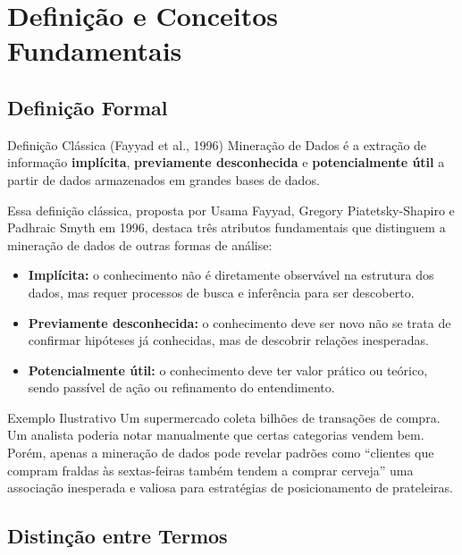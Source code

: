 \documentclass[12pt,a4paper]{article}
\begin{document}
\section{Definição e Conceitos Fundamentais}

\subsection{Definição Formal}

\begin{definicaobox}{Definição Clássica (Fayyad et al., 1996)}
Mineração de Dados é a extração de informação \textbf{implícita},
\textbf{previamente desconhecida} e \textbf{potencialmente útil}
a partir de dados armazenados em grandes bases de dados.
\end{definicaobox}

Essa definição clássica, proposta por Usama Fayyad, Gregory Piatetsky-Shapiro e Padhraic Smyth em 1996, destaca três atributos fundamentais que distinguem a mineração de dados de outras formas de análise:

\begin{itemize}[leftmargin=*]
  \item \textbf{Implícita:} o conhecimento não é diretamente observável na estrutura dos dados, mas requer processos de busca e inferência para ser descoberto.
  \item \textbf{Previamente desconhecida:} o conhecimento deve ser novo não se trata de confirmar hipóteses já conhecidas, mas de descobrir relações inesperadas.
  \item \textbf{Potencialmente útil:} o conhecimento deve ter valor prático ou teórico, sendo passível de ação ou refinamento do entendimento.
\end{itemize}

\begin{exemplobox}{Exemplo Ilustrativo}
Um supermercado coleta bilhões de transações de compra. Um analista poderia notar manualmente que certas categorias vendem bem. Porém, apenas a mineração de dados pode revelar padrões como ``clientes que compram fraldas às sextas-feiras também tendem a comprar cerveja'' uma associação inesperada e valiosa para estratégias de posicionamento de prateleiras.
\end{exemplobox}

\subsection{Distinção entre Termos}
\end{document}

